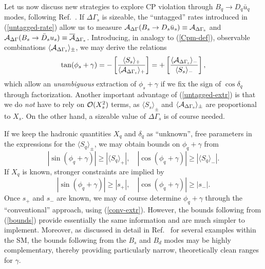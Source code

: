 \documentclass[12pt]{article}
\begin{document}
Let us now discuss new strategies to explore CP violation through 
$B_q\to D_q \bar u_q$ modes, following Ref.~\cite{RF-gam-ca}. 
If $\Delta\Gamma_s$ is sizeable, the ``untagged'' 
rates introduced in (\ref{untagged-rate}) allow us to measure 
${\cal A}_{\rm \Delta\Gamma}(B_s\to D_s\bar u_s)
\equiv {\cal A}_{\rm \Delta\Gamma_s}$ and 
${\cal A}_{\rm \Delta\Gamma}(B_s\to \bar D_s u_s)\equiv 
\overline{{\cal A}}_{\rm \Delta\Gamma_s}$. Introducing, in analogy 
to (\ref{Cpm-def}), observable combinations 
$\langle{\cal A}_{\rm \Delta\Gamma_s}\rangle_\pm$, we may derive the relations
\begin{equation}\label{untagged-extr}
\tan(\phi_s+\gamma)=
-\left[\frac{\langle S_s\rangle_+}{\langle{\cal A}_{\rm \Delta\Gamma_s}
\rangle_+}\right]
=+\left[\frac{\langle{\cal A}_{\rm \Delta\Gamma_s}
\rangle_-}{\langle S_s\rangle_-}\right],
\end{equation}
which allow an {\it unambiguous} extraction of $\phi_s+\gamma$ if we fix
the sign of $\cos\delta_q$ through factorization. 
Another important advantage 
of (\ref{untagged-extr}) is that we do {\it not} have to rely on 
${\cal O}(X_s^2)$ terms, as $\langle S_s\rangle_\pm$ and 
$\langle {\cal A}_{\rm \Delta\Gamma_s}\rangle_\pm$ are proportional to $X_s$.
On the other hand, a sizeable value of $\Delta\Gamma_s$ is of course
needed.

If we keep the hadronic quantities $X_q$ and $\delta_q$  
as ``unknown'', free parameters in the expressions for the
$\langle S_q\rangle_\pm$, we may obtain bounds on $\phi_q+\gamma$ from
\begin{equation}
|\sin(\phi_q+\gamma)|\geq|\langle S_q\rangle_+|, \quad
|\cos(\phi_q+\gamma)|\geq|\langle S_q\rangle_-|.
\end{equation}
If $X_q$ is known, stronger constraints are implied by 
\begin{equation}\label{bounds}
|\sin(\phi_q+\gamma)|\geq|s_+|, \quad
|\cos(\phi_q+\gamma)|\geq|s_-|.
\end{equation}
Once $s_+$ and $s_-$ are known, we may of course determine
$\phi_q+\gamma$ through the ``conventional'' approach, using 
(\ref{conv-extr}). However, the bounds following from 
(\ref{bounds}) provide essentially the same information 
and are much simpler to 
implement. Moreover, as discussed in detail in Ref.~\cite{RF-gam-ca}
for several examples within the SM, the bounds following from the $B_s$ and 
$B_d$ modes may be highly complementary, thereby providing particularly 
narrow, theoretically clean ranges for $\gamma$. 
\end{document}
